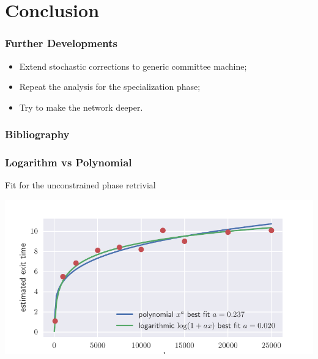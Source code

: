 \documentclass{beamer}
\begin{document}
\section{Conclusion}
\begin{frame}
  \frametitle{Further Developments}
  \begin{itemize}
    \item Extend stochastic corrections to generic committee machine;
    \item Repeat the analysis for the specialization phase;
    \item Try to make the network deeper.
  \end{itemize}
  \vfill

  \begin{center}
  \end{center}
\end{frame}

\begin{frame}
  \frametitle{Bibliography}
  \printbibliography
  \vspace{3cm}
\end{frame}

\begin{frame}
  \frametitle{Logarithm vs Polynomial}
  Fit for the unconstrained phase retrivial
  \begin{center}
    \includegraphics[width=1.05\textwidth]{figures/log_fit.pdf}
  \end{center}
\end{frame}
\end{document}
